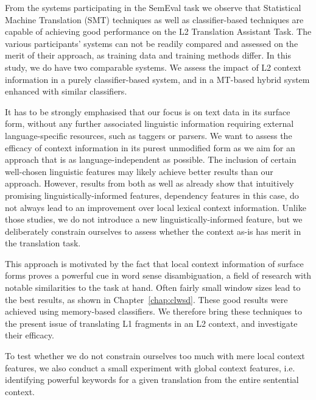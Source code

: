 From the systems participating in the SemEval task we observe that Statistical
Machine Translation (SMT) techniques as well as classifier-based techniques are
capable of achieving good performance on the L2 Translation Assistant Task. The
various participants' systems can not be readily compared and assessed on the
merit of their approach, as training data and training methods differ. In this
study, we do have two comparable systems. We assess the impact of L2 context
information in a purely classifier-based system, and in a MT-based hybrid system
enhanced with similar classifiers.

It has to be strongly emphasised that our focus is on text data in its surface form,
without any further associated linguistic information requiring external
language-specific resources, such as taggers or parsers. We want to assess the
efficacy of context information in its purest unmodified form as we aim for an
approach that is as language-independent as possible. The inclusion of certain
well-chosen linguistic features may likely achieve better results than our
approach. However, results from both \cite{UNAL} as well as \cite{IUCL} already
show that intuitively promising linguistically-informed features, dependency
features in this case, do not always lead to an improvement over local lexical
context information. Unlike those studies, we do not introduce a new
linguistically-informed feature, but we deliberately constrain ourselves to
assess whether the context as-is has merit in the translation task.

This approach is motivated by the fact that local context information of
surface forms proves a powerful cue in word sense disambiguation, a field of
research with notable similarities to the task at hand. Often fairly small
window sizes lead to the best results, as shown in Chapter~\ref{chap:clwsd}.
These good results were achieved using memory-based classifiers. We therefore
bring these techniques to the present issue of translating L1 fragments in an
L2 context, and investigate their efficacy.

To test whether we do not constrain ourselves too much with mere local context
features, we also conduct a small experiment with global context features, i.e.
identifying powerful keywords for a given translation from the entire
sentential context.



